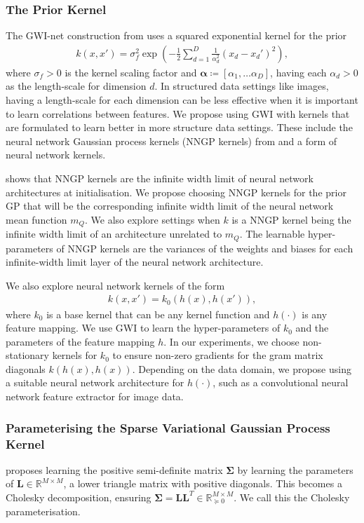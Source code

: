 \documentclass{article}
\numberwithin{equation}{section}
\begin{document}
\subsubsection{The Prior Kernel}
The GWI-net construction from \cite{wild2022generalized} uses a squared exponential kernel for the prior
\begin{align}
    k(x, x') = \sigma^2_f \exp\left(-\frac{1}{2} \sum_{d=1}^D \frac{1}{\alpha_d^2}(x_d-x_d')^2\right),
\end{align}
where $\sigma_f > 0$ is the kernel scaling factor and $\boldsymbol{\alpha} \coloneqq [\alpha_1, \dots \alpha_D]$, having each $\alpha_d >0$ as the length-scale for dimension $d$.
In structured data settings like images, having a length-scale for each dimension can be less effective when it is important to learn correlations between features.
We propose using GWI with kernels that are formulated to learn better in more structure data settings. These include the neural network Gaussian process kernels (NNGP kernels) from \cite{novak2019neural} and a form of neural network kernels.

\cite{novak2019neural} shows that NNGP kernels are the infinite width limit of neural network architectures at initialisation.
We propose choosing NNGP kernels for the prior GP that will be the corresponding infinite width limit of the neural network mean function $m_Q$.
We also explore settings when $k$ is a NNGP kernel being the infinite width limit of an architecture unrelated to $m_Q$.
The learnable hyper-parameters of NNGP kernels are the variances of the weights and biases for each infinite-width limit layer of the neural network architecture.

We also explore neural network kernels of the form
\begin{align}
    k(x, x') = k_0(h(x), h(x')),
\end{align}
where $k_0$ is a base kernel that can be any kernel function and $h(\cdot)$ is any feature mapping. We use GWI to learn the hyper-parameters of $k_0$ and the parameters of the  feature mapping $h$. In our experiments, we choose non-stationary kernels for $k_0$ to ensure non-zero gradients for the gram matrix diagonals $k(h(x), h(x))$. Depending on the data domain, we propose using a suitable neural network architecture for $h(\cdot)$, such as a convolutional neural network feature extractor for image data.



\subsubsection{Parameterising the Sparse Variational Gaussian Process Kernel}
\cite{wild2022generalized} proposes learning the positive semi-definite matrix $\mathbf{\Sigma}$ by learning the parameters of $\mathbf{L} \in \mathbb{R}^{M \times M}$, a lower triangle matrix with positive diagonals. This becomes a Cholesky decomposition, ensuring $\mathbf{\Sigma} = \mathbf{L}\mathbf{L}^T \in \mathbb{R}^{M \times M}_{\succcurlyeq 0}$. We call this the Cholesky parameterisation.
\end{document}
